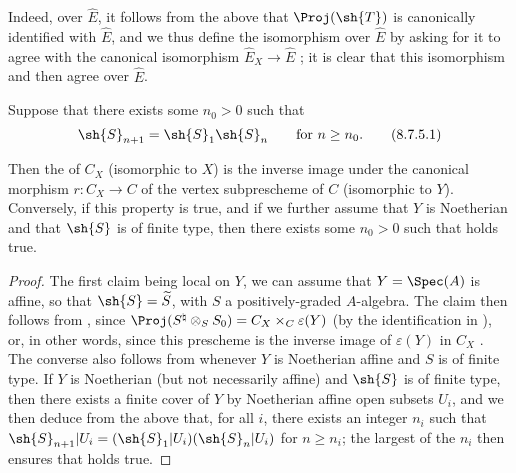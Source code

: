 \begin{remark}[8.7.4]
\begin{enumerate}
    Indeed, over $\widehat{E}$, it follows from the above that $\Proj(\sh{T})$ is canonically identified with $\widehat{E}$, and we thus define the isomorphism  over $\widehat{E}$ by asking for it to agree with the canonical isomorphism $\widehat{E}_X\to\widehat{E}$ ;
    it is clear that this isomorphism and  then agree over $\widehat{E}$.
\end{enumerate}
\end{remark}

\begin{corollary}[8.7.5]
\label{II.8.7.5}
Suppose that there exists some $n_0>0$ such that
\[
\label{II.8.7.5.1}
  \sh{S}_{n+1} = \sh{S}_1\sh{S}_n
  \qquad
  \text{for }n\geq n_0.
\tag{8.7.5.1}
\]

Then the  of $C_X$ (isomorphic to $X$) is the inverse image under the canonical morphism $r:C_X\to C$ of the vertex subprescheme of $C$ (isomorphic to $Y$).
Conversely, if this property is true, and if we further assume that $Y$ is Noetherian and that $\sh{S}$ is of finite type, then there exists some $n_0>0$ such that  holds true.
\end{corollary}

\begin{proof}
The first claim being local on $Y$, we can assume that $Y=\Spec(A)$ is affine, so that $\sh{S}=\widetilde{S}$, with $S$ a positively-graded $A$-algebra.
The claim then follows from , since $\Proj(S^\natural\otimes_S S_0) = C_X\times_C\varepsilon(Y)$ (by the identification in ), or, in other words, since this prescheme is the inverse image of $\varepsilon(Y)$ in $C_X$ .
The converse also follows from  whenever $Y$ is Noetherian affine and $S$ is of finite type.
If $Y$ is Noetherian (but not necessarily affine) and $\sh{S}$ is of finite type, then there exists a finite cover of $Y$ by Noetherian affine open subsets $U_i$, and we then deduce from the above that, for all $i$, there exists an integer $n_i$ such that $\sh{S}_{n+1}|U_i = (\sh{S}_1|U_i)(\sh{S}_n|U_i)$ for $n\geq n_i$;
the largest of the $n_i$ then ensures that  holds true.
\end{proof}

